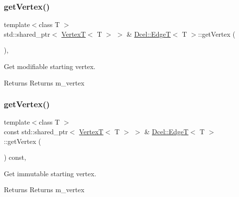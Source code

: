 \subsubsection{\texorpdfstring{get\+Vertex()}{getVertex()}\hspace{0.1cm}{\footnotesize\ttfamily [1/2]}}
{\footnotesize\ttfamily template$<$class T $>$ \\
std\+::shared\+\_\+ptr$<$ \hyperlink{classDcel_1_1VertexT}{VertexT}$<$ T $>$ $>$ \& \hyperlink{classDcel_1_1EdgeT}{Dcel\+::\+EdgeT}$<$ T $>$\+::get\+Vertex (\begin{DoxyParamCaption}{ }\end{DoxyParamCaption})\hspace{0.3cm}{\ttfamily [inline]}, {\ttfamily [noexcept]}}



Get modifiable starting vertex. 

\begin{DoxyReturn}{Returns}
Returns m\+\_\+vertex 
\end{DoxyReturn}
\mbox{\label{classDcel_1_1EdgeT_afa36dc535018588ba2238c5f42a9abd8}} 
\subsubsection{\texorpdfstring{get\+Vertex()}{getVertex()}\hspace{0.1cm}{\footnotesize\ttfamily [2/2]}}
{\footnotesize\ttfamily template$<$class T $>$ \\
const std\+::shared\+\_\+ptr$<$ \hyperlink{classDcel_1_1VertexT}{VertexT}$<$ T $>$ $>$ \& \hyperlink{classDcel_1_1EdgeT}{Dcel\+::\+EdgeT}$<$ T $>$\+::get\+Vertex (\begin{DoxyParamCaption}{ }\end{DoxyParamCaption}) const\hspace{0.3cm}{\ttfamily [inline]}, {\ttfamily [noexcept]}}



Get immutable starting vertex. 

\begin{DoxyReturn}{Returns}
Returns m\+\_\+vertex 
\end{DoxyReturn}
\mbox{\label{classDcel_1_1EdgeT_ab937dca20cefcae4083b3cf873d83265}} 

